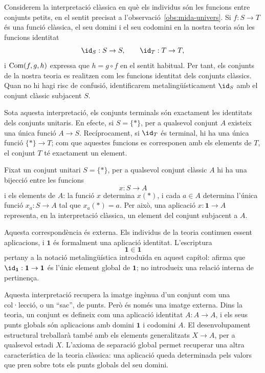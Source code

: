 \begin{observacio}\label{obs:model-classic-terminal}
Considerem la interpretació clàssica en què els individus són les funcions entre conjunts petits, en el sentit precisat a l'observació~\ref{obs:mida-univers}. Si \(f:S\to T\) és una funció clàssica, el seu domini i el seu codomini en la nostra teoria són les funcions identitat
\[
\id_S:S\to S,
\qquad
\id_T:T\to T,
\]
i \(\operatorname{Com}(f,g,h)\) expressa que \(h=g\circ f\) en el sentit habitual. Per tant, els conjunts de la nostra teoria es realitzen com les funcions identitat dels conjunts clàssics. Quan no hi hagi risc de confusió, identificarem metalingüísticament \(\id_S\) amb el conjunt clàssic subjacent \(S\).

Sota aquesta interpretació, els conjunts terminals són exactament les identitats dels conjunts unitaris. En efecte, si \(S=\{*\}\), per a qualsevol conjunt \(A\) existeix una única funció \(A\to S\). Recíprocament, si \(\id_T\) és terminal, hi ha una única funció \(\{*\}\to T\); com que aquestes funcions es corresponen amb els elements de \(T\), el conjunt \(T\) té exactament un element.

Fixat un conjunt unitari \(S=\{*\}\), per a qualsevol conjunt clàssic \(A\) hi ha una bijecció entre les funcions
\[
x:S\to A
\]
i els elements de \(A\): la funció \(x\) determina \(x(*)\), i cada \(a\in A\) determina l'única funció \(x_a:S\to A\) tal que \(x_a(*)=a\). Per això, una aplicació \(x:\mathbf1\to A\) representa, en la interpretació clàssica, un element del conjunt subjacent a \(A\).

Aquesta correspondència és externa. Els individus de la teoria continuen essent aplicacions, i \(\mathbf1\) és formalment una aplicació identitat. L'escriptura
\[
\mathbf1\in\mathbf1
\]
pertany a la notació metalingüística introduïda en aquest capítol: afirma que \(\id_{\mathbf1}:\mathbf1\to\mathbf1\) és l'únic element global de \(\mathbf1\); no introdueix una relació interna de pertinença.

Aquesta interpretació recupera la imatge ingènua d'un conjunt com una col·lecció, o un \enquote{sac}, de punts. Però és només una imatge externa. Dins la teoria, un conjunt es defineix com una aplicació identitat \(A:A\to A\), i els seus punts globals són aplicacions amb domini \(\mathbf1\) i codomini \(A\). El desenvolupament estructural treballarà també amb els elements generalitzats \(X\to A\), per a qualsevol estadi \(X\). L'axioma de separació global permet recuperar una altra característica de la teoria clàssica: una aplicació queda determinada pels valors que pren sobre tots els punts globals del seu domini.
\end{observacio}

